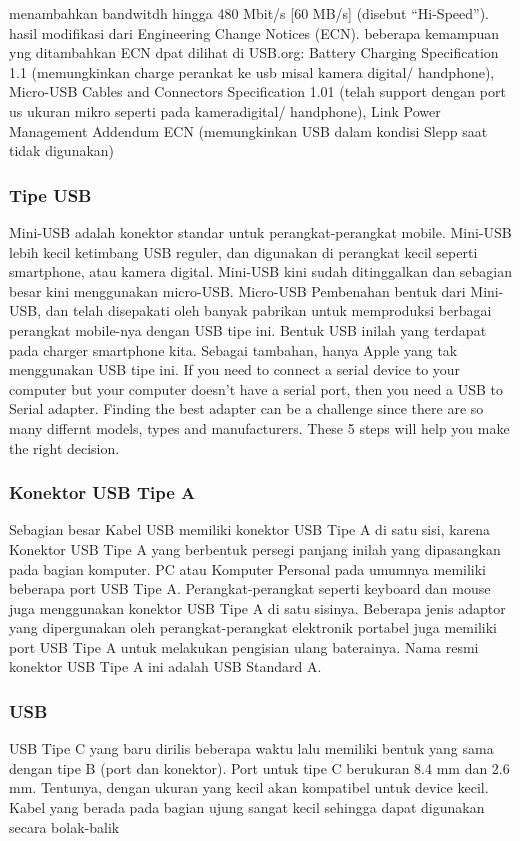 menambahkan bandwitdh hingga 480 Mbit/s [60 MB/s] (disebut “Hi-Speed”). hasil modifikasi dari Engineering Change Notices (ECN). beberapa kemampuan yng ditambahkan ECN dpat dilihat di USB.org: Battery Charging Specification 1.1 (memungkinkan charge perankat ke usb misal kamera digital/ handphone), Micro-USB Cables and Connectors Specification 1.01 (telah support dengan port us ukuran mikro seperti pada kameradigital/ handphone), Link Power Management Addendum ECN (memungkinkan USB dalam kondisi Slepp saat tidak digunakan)

\subsubsection{Tipe USB}
Mini-USB adalah konektor standar untuk perangkat-perangkat mobile. Mini-USB lebih kecil ketimbang USB reguler, dan digunakan di perangkat kecil seperti smartphone, atau kamera digital. Mini-USB kini sudah ditinggalkan dan sebagian besar kini menggunakan micro-USB.
Micro-USB
Pembenahan bentuk dari Mini-USB, dan telah disepakati oleh banyak pabrikan untuk memproduksi berbagai perangkat mobile-nya dengan USB tipe ini. Bentuk USB inilah yang terdapat pada charger smartphone kita. Sebagai tambahan, hanya Apple yang tak menggunakan USB tipe ini.
If you need to connect a serial device to your computer but your computer doesn't have a serial port, then you need a USB to Serial adapter. Finding the best adapter can be a challenge since there are so many differnt models, types and manufacturers. These 5 steps will help you make the right decision. 

\subsubsection{Konektor USB Tipe A}
Sebagian besar Kabel USB memiliki konektor USB Tipe A di satu sisi, karena Konektor USB Tipe A yang berbentuk persegi panjang inilah yang dipasangkan pada bagian komputer. PC atau Komputer Personal pada umumnya memiliki beberapa port USB Tipe A. Perangkat-perangkat seperti keyboard dan mouse juga menggunakan konektor USB Tipe A di satu sisinya. Beberapa jenis adaptor yang dipergunakan oleh perangkat-perangkat elektronik portabel juga memiliki port USB Tipe A untuk melakukan pengisian ulang baterainya. Nama resmi konektor USB Tipe A ini adalah USB Standard A.

\subsubsection{USB}
USB Tipe C yang baru dirilis beberapa waktu lalu memiliki bentuk yang sama dengan tipe B (port dan konektor). Port untuk tipe C berukuran 8.4 mm dan 2.6 mm. Tentunya, dengan ukuran yang kecil akan kompatibel untuk device kecil. Kabel yang berada pada bagian ujung sangat kecil sehingga dapat digunakan secara bolak-balik
